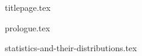 \documentclass[twoside]{article}
\begin{document}
{titlepage.tex}

\setcounter{section}{-1}

{prologue.tex}

\tableofcontents

{statistics-and-their-distributions.tex}
\end{document}
